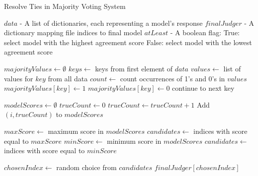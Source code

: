 \begin{algorithm}
    \caption{Resolve Ties in Majority Voting System}
    \begin{algorithmic}[1]
        \Require
        \Statex $data$ - A list of dictionaries, each representing a model's response
        \Statex $finalJudger$ - A dictionary mapping file indices to final model
        \Statex $atLeast$ - A boolean flag:
        \Statex \hspace{1em} True: select model with the highest agreement score
        \Statex \hspace{1em} False: select model with the lowest agreement score

            \State $majorityValues \gets \emptyset$
            \State $keys \gets $ keys from first element of $data$
                \State $values \gets $ list of values for $key$ from all data
                \State $count \gets $ count occurrences of 1's and 0's in $values$
                    \State $majorityValues[key] \gets 1$
                \State $majorityValues[key] \gets 0$
                \Else
                    \State continue to next key
                \EndIf
            \EndFor

            \State $modelScores \gets \emptyset$
                \State $trueCount \gets 0$
                        \State $trueCount \gets trueCount + 1$
                    \EndIf
                \EndFor
                \State Add $(i, trueCount)$ to $modelScores$
            \EndFor

                \State $maxScore \gets $ maximum score in $modelScores$
                \State $candidates \gets $ indices with score equal to $maxScore$
            \Else
                \State $minScore \gets $ minimum score in $modelScores$
                \State $candidates \gets $ indices with score equal to $minScore$
            \EndIf

            \State $chosenIndex \gets $ random choice from $candidates$
            \State \Return $finalJudger[chosenIndex]$
        \EndProcedure
    \end{algorithmic}\label{alg:model-selection}
\end{algorithm}

